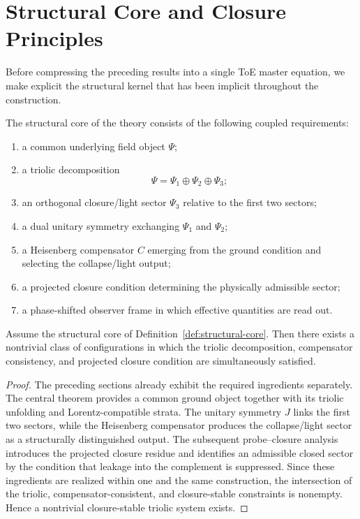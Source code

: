 \section{Structural Core and Closure Principles}
\label{sec:structural-core}

Before compressing the preceding results into a single ToE master equation, we
make explicit the structural kernel that has been implicit throughout the
construction.

\begin{definition}
\label{def:structural-core}
The structural core of the theory consists of the following coupled
requirements:
\begin{enumerate}
\item a common underlying field object $\Psi$;
\item a triolic decomposition
\[
 \Psi = \Psi_1\oplus\Psi_2\oplus\Psi_3;
\]
\item an orthogonal closure/light sector $\Psi_3$ relative to the first two
sectors;
\item a dual unitary symmetry exchanging $\Psi_1$ and $\Psi_2$;
\item a Heisenberg compensator $C$ emerging from the ground condition and
selecting the collapse/light output;
\item a projected closure condition determining the physically admissible
sector;
\item a phase-shifted observer frame in which effective quantities are read
out.
\end{enumerate}
\end{definition}

\begin{theorem}
\label{thm:structural-existence}
Assume the structural core of Definition~\ref{def:structural-core}. Then there
exists a nontrivial class of configurations in which the triolic decomposition,
compensator consistency, and projected closure condition are simultaneously
satisfied.
\end{theorem}

\begin{proof}
The preceding sections already exhibit the required ingredients separately.
The central theorem provides a common ground object together with its triolic
unfolding and Lorentz-compatible strata. The unitary symmetry $J$ links the
first two sectors, while the Heisenberg compensator produces the
collapse/light sector as a structurally distinguished output. The subsequent
probe--closure analysis introduces the projected closure residue and identifies
an admissible closed sector by the condition that leakage into the complement
is suppressed. Since these ingredients are realized within one and the same
construction, the intersection of the triolic, compensator-consistent, and
closure-stable constraints is nonempty. Hence a nontrivial closure-stable
triolic system exists.
\end{proof}

